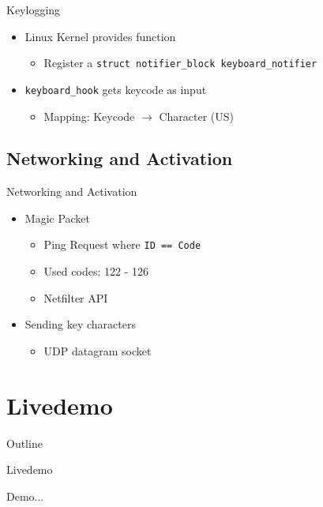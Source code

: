 \documentclass[]{beamer}
\begin{document}
\begin{frame}[t]{Keylogging}
  \begin{itemize}
    \item Linux Kernel provides function
    \begin{itemize}
      \item Register a \lstinline{struct notifier_block keyboard_notifier}
    \end{itemize}
    \item \lstinline{keyboard_hook} gets keycode as input
    \begin{itemize}
      \item Mapping: Keycode $\rightarrow$ Character (US)
    \end{itemize}
  \end{itemize}
  
\end{frame}



\subsection{Networking and Activation}

\begin{frame}[t]{Networking and Activation}
  \begin{itemize}
    \item Magic Packet
    \begin{itemize}
      \item Ping Request where \lstinline{ID == Code}
      \item Used codes: 122 - 126
      \item Netfilter API
    \end{itemize}
    \item Sending key characters
    \begin{itemize}
      \item UDP datagram socket
    \end{itemize}
  \end{itemize}
\end{frame}


\section{Livedemo}
\begin{frame}[t]{Outline}
  \tableofcontents[currentsection]
\end{frame}

\begin{frame}[t]{Livedemo}
   \begin{center} \LARGE{Demo...} \end{center}
\end{frame}
\end{document}
